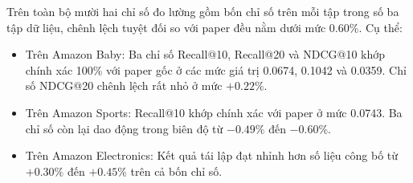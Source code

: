 \begin{table}[H]
\centering
\small
\setlength{\tabcolsep}{6pt}
\renewcommand{\arraystretch}{1.15}
\caption{Kết quả tái lập thực nghiệm STAIR so với paper gốc trên ba tập dữ liệu.}
\label{tab:stair_reproduction}
\end{table}

Trên toàn bộ mười hai chỉ số đo lường gồm bốn chỉ số trên mỗi tập trong số ba tập dữ liệu, chênh lệch tuyệt đối so với paper đều nằm dưới mức 0.60\%. Cụ thể:
\begin{itemize}[leftmargin=*]
    \item Trên Amazon Baby: Ba chỉ số Recall@10, Recall@20 và NDCG@10 khớp chính xác 100\% với paper gốc ở các mức giá trị 0.0674, 0.1042 và 0.0359. Chỉ số NDCG@20 chênh lệch rất nhỏ ở mức $+0.22\%$.
    \item Trên Amazon Sports: Recall@10 khớp chính xác với paper ở mức 0.0743. Ba chỉ số còn lại dao động trong biên độ từ $-0.49\%$ đến $-0.60\%$.
    \item Trên Amazon Electronics: Kết quả tái lập đạt nhỉnh hơn số liệu công bố từ $+0.30\%$ đến $+0.45\%$ trên cả bốn chỉ số.
\end{itemize}

